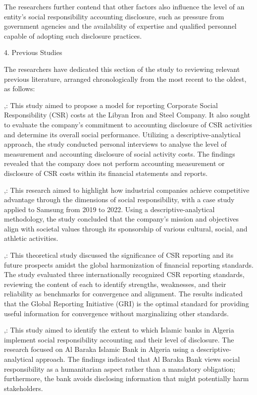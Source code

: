 \documentclass[10pt]{NSP1}
\begin{document}
The researchers further contend that other factors also influence the level of an entity's social responsibility accounting disclosure, such as pressure from government agencies and the availability of expertise and qualified personnel capable of adopting such disclosure practices.

4. Previous Studies

The researchers have dedicated this section of the study to reviewing relevant previous literature, arranged chronologically from the most recent to the oldest, as follows:

\cite{ref29},: This study aimed to propose a model for reporting Corporate Social Responsibility (CSR) costs at the Libyan Iron and Steel Company. It also sought to evaluate the company's commitment to accounting disclosure of CSR activities and determine its overall social performance. Utilizing a descriptive-analytical approach, the study conducted personal interviews to analyse the level of measurement and accounting disclosure of social activity costs. The findings revealed that the company does not perform accounting measurement or disclosure of CSR costs within its financial statements and reports.

\cite{ref31},: This research aimed to highlight how industrial companies achieve competitive advantage through the dimensions of social responsibility, with a case study applied to Samsung from 2019 to 2022. Using a descriptive-analytical methodology, the study concluded that the company's mission and objectives align with societal values through its sponsorship of various cultural, social, and athletic activities.

\cite{ref28},: This theoretical study discussed the significance of CSR reporting and its future prospects amidst the global harmonization of financial reporting standards. The study evaluated three internationally recognized CSR reporting standards, reviewing the content of each to identify strengths, weaknesses, and their reliability as benchmarks for convergence and alignment. The results indicated that the Global Reporting Initiative (GRI) is the optimal standard for providing useful information for convergence without marginalizing other standards.

\cite{ref21},: This study aimed to identify the extent to which Islamic banks in Algeria implement social responsibility accounting and their level of disclosure. The research focused on Al Baraka Islamic Bank in Algeria using a descriptive-analytical approach. The findings indicated that Al Baraka Bank views social responsibility as a humanitarian aspect rather than a mandatory obligation; furthermore, the bank avoids disclosing information that might potentially harm stakeholders.
\end{document}
